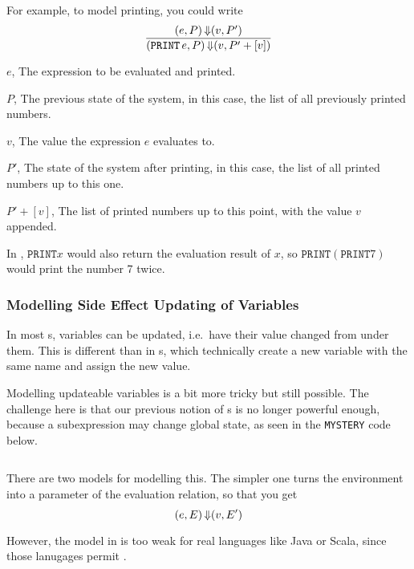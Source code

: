 For example, to model printing, you could write
\begin{equation}\label{eq:Semantic_Side_Effect_Printing}
  \frac{(e, P) \operatorname{\Downarrow} (v, P')}{(\mathtt{PRINT\,} e, P) \operatorname{\Downarrow} (v, P'+[v])}
\end{equation}
\begin{description}[noitemsep]
\item $e$, The expression to be evaluated and printed.
\item $P$, The previous state of the system, in this case, the list of all previously printed numbers.
\item $v$, The value the expression $e$ evaluates to.
\item $P'$, The state of the system after printing, in this case, the list of all printed numbers up to this one.
\item $P'+[v]$, The list of printed numbers up to this point, with the value $v$ appended.
\end{description}

\begin{remark*}
  In , $\mathtt{PRINT} x$ would also return the evaluation result of $x$, so $\mathtt{PRINT} (\mathtt{PRINT} 7)$ would print the number 7 twice.
\end{remark*}

\subsubsection{Modelling Side Effect Updating of Variables}\label{subsubsec:Model_Side_Effect_Variable_Update}
In most s, variables can be updated, i.e.\ have their value changed from under them.
This is different than in s, which technically create a new variable with the same name and assign the new value.

Modelling updateable variables is a bit more tricky but still possible.
The challenge here is that our previous notion of s is no longer powerful enough, because a subexpression may change global state, as seen in the \texttt{MYSTERY} code below.

\inputminted[frame=lines,linenos]{pascal}{./EDAP05-Concepts_Programming_Languages-Sections/Functional_Programming/Code/Global_State_Change.pas}

There are two models for modelling this.
The simpler one turns the environment into a parameter of the evaluation relation, so that you get
\begin{equation}\label{eq:Simple_Side_Effect_Variable_Update}
  (e, E) \operatorname{\Downarrow} (v, E')
\end{equation}

However, the model in  is too weak for real languages like Java or Scala, since those lanugages permit .

